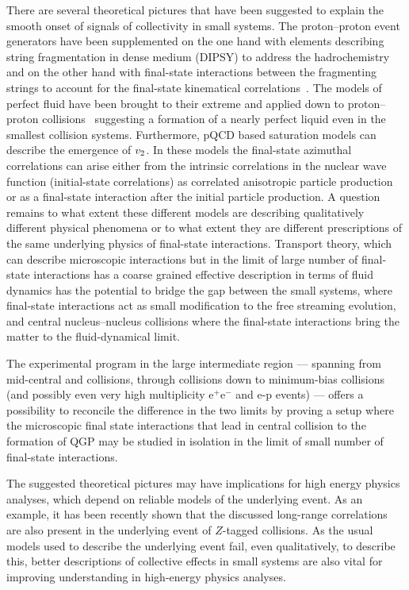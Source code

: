 \documentclass[../report.tex]{subfiles}
\begin{document}
There are several theoretical pictures that have been suggested to explain the smooth onset of signals of collectivity in small systems. The proton--proton event generators have been supplemented on the one hand with elements describing string fragmentation in dense medium (DIPSY) to address the hadrochemistry and on the other hand with final-state interactions between the fragmenting strings to account for the final-state kinematical correlations~\cite{Bierlich:2017vhg}. 
The models of perfect fluid have been brought to their extreme and applied down to proton--proton collisions~\cite{Weller:2017tsr,Aidala:2018mcw} suggesting a formation of a nearly perfect liquid even in the smallest collision systems. Furthermore, pQCD based saturation models can describe the emergence of $v_{\rm{2}}$. In these models the final-state azimuthal correlations can arise either from the intrinsic correlations in the nuclear wave function (initial-state correlations) as correlated anisotropic particle production or as a final-state interaction after the initial particle production. 
A question remains to what extent these different models are describing qualitatively different physical phenomena or to what extent they are different prescriptions of the same underlying physics of final-state interactions. Transport theory, which can describe microscopic interactions but in the limit of large number of final-state interactions has a coarse grained effective description in terms of fluid dynamics has the potential to bridge the gap between the small systems, where final-state interactions act as small modification to the free streaming evolution, and central nucleus--nucleus collisions where the final-state interactions bring the matter to the fluid-dynamical limit. 

The experimental program in the large intermediate region --- spanning from mid-central \PbPb and \XeXe collisions, through \pPb collisions down to minimum-bias \pp collisions (and possibly even very high multiplicity e$^{+}$e$^{-}$ and e-p events) --- offers a possibility to reconcile the difference in the two limits by proving a setup where the microscopic final state interactions that lead in central \PbPb collision to the formation of QGP may be studied in isolation in the limit of small number of final-state interactions.  

The suggested theoretical pictures may have implications for high energy physics analyses, which depend on reliable models of the underlying event. As an example, it has been recently shown that the discussed long-range correlations are also present in the underlying event of $Z$-tagged \pp collisions. As the usual models used to describe the underlying event fail, even qualitatively, to describe this, better descriptions of collective effects in small systems are also vital for improving understanding in high-energy physics analyses.
\end{document}
